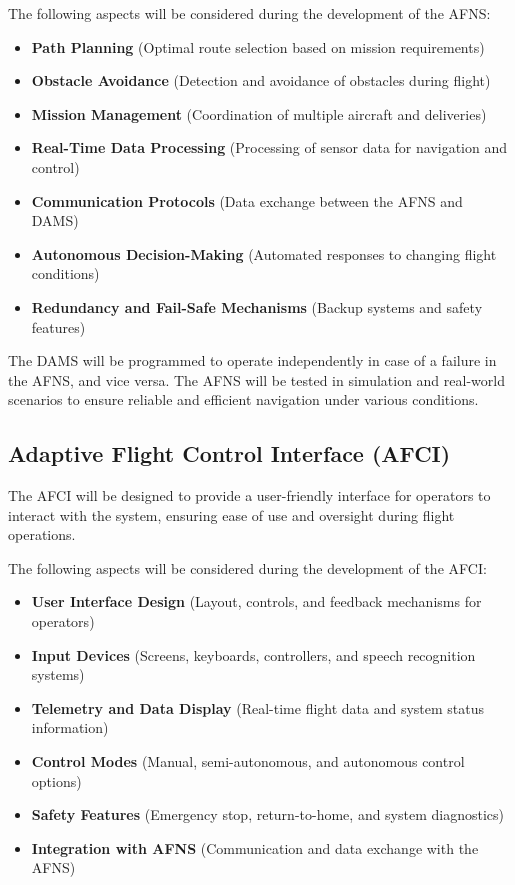 \documentclass[12pt]{article}
\begin{document}
The following aspects will be considered during the development of the AFNS:
\begin{itemize}
    \item \textbf{Path Planning} (Optimal route selection based on mission requirements)
    \item \textbf{Obstacle Avoidance} (Detection and avoidance of obstacles during flight)
    \item \textbf{Mission Management} (Coordination of multiple aircraft and deliveries)
    \item \textbf{Real-Time Data Processing} (Processing of sensor data for navigation and control)
    \item \textbf{Communication Protocols} (Data exchange between the AFNS and DAMS)
    \item \textbf{Autonomous Decision-Making} (Automated responses to changing flight conditions)
    \item \textbf{Redundancy and Fail-Safe Mechanisms} (Backup systems and safety features)
\end{itemize}

The DAMS will be programmed to operate independently in case of a failure in the AFNS, and vice versa. The AFNS will be tested in simulation and real-world scenarios to ensure reliable and efficient navigation under various conditions.

\subsection{Adaptive Flight Control Interface (AFCI)}
The AFCI will be designed to provide a user-friendly interface for operators to interact with the system, ensuring ease of use and oversight during flight operations.

The following aspects will be considered during the development of the AFCI:
\begin{itemize}
    \item \textbf{User Interface Design} (Layout, controls, and feedback mechanisms for operators)
    \item \textbf{Input Devices} (Screens, keyboards, controllers, and speech recognition systems)
    \item \textbf{Telemetry and Data Display} (Real-time flight data and system status information)
    \item \textbf{Control Modes} (Manual, semi-autonomous, and autonomous control options)
    \item \textbf{Safety Features} (Emergency stop, return-to-home, and system diagnostics)
    \item \textbf{Integration with AFNS} (Communication and data exchange with the AFNS)
\end{itemize}
\end{document}

